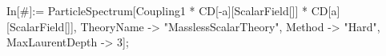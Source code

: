 In[#]:= ParticleSpectrum[Coupling1 * CD[-a][ScalarField[]] * CD[a][ScalarField[]], TheoryName -> "MasslessScalarTheory", Method -> "Hard", MaxLaurentDepth -> 3]; 